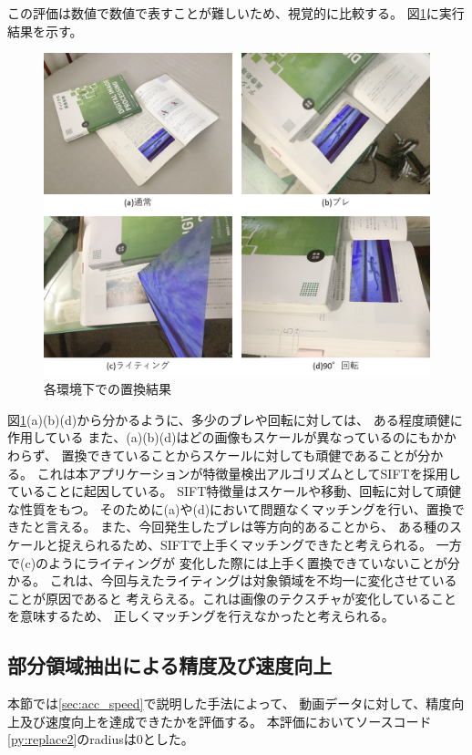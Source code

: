 この評価は数値で数値で表すことが難しいため、視覚的に比較する。
図\ref{fig:various_env}に実行結果を示す。
\begin{figure}[h]
    \centering
    \includegraphics[width=1\linewidth]{fig/env.png}
    \caption{各環境下での置換結果}
    \label{fig:various_env}
\end{figure}
図\ref{fig:various_env}(a)(b)(d)から分かるように、多少のブレや回転に対しては、
ある程度頑健に作用している
また、(a)(b)(d)はどの画像もスケールが異なっているのにもかかわらず、
置換できていることからスケールに対しても頑健であることが分かる。
これは本アプリケーションが特徴量検出アルゴリズムとしてSIFTを採用していることに起因している。
SIFT特徴量はスケールや移動、回転に対して頑健な性質をもつ。
そのために(a)や(d)において問題なくマッチングを行い、置換できたと言える。
また、今回発生したブレは等方向的あることから、
ある種のスケールと捉えられるため、SIFTで上手くマッチングできたと考えられる。
一方で(c)のようにライティングが
変化した際には上手く置換できていないことが分かる。
これは、今回与えたライティングは対象領域を不均一に変化させていることが原因であると
考えらえる。これは画像のテクスチャが変化していることを意味するため、
正しくマッチングを行えなかったと考えられる。

\subsection{部分領域抽出による精度及び速度向上}
本節では\ref{sec:acc_speed}で説明した手法によって、
動画データに対して、精度向上及び速度向上を達成できたかを評価する。
本評価においてソースコード\ref{py:replace2}のradiusは0とした。

